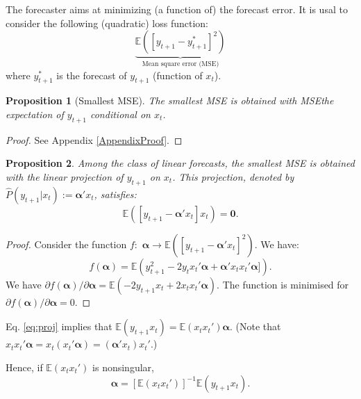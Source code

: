 \documentclass[
  12pt,
]{book}
\newtheorem{proposition}{Proposition}[chapter]
\theoremstyle{definition}
\theoremstyle{definition}
\theoremstyle{definition}
\theoremstyle{definition}
\theoremstyle{remark}
\begin{document}
The forecaster aims at minimizing (a function of) the forecast error. It is usal to consider the following (quadratic) loss function:
\[
\underbrace{\mathbb{E}([y_{t+1} - y^*_{t+1}]^2)}_{\mbox{Mean square error (MSE)}}
\]
where \(y^*_{t+1}\) is the forecast of \(y_{t+1}\) (function of \(x_t\)).

\begin{proposition}[Smallest MSE]
\protect\hypertarget{prp:smallestMSE}{}\label{prp:smallestMSE}The smallest MSE is obtained with MSEthe expectation of \(y_{t+1}\) conditional on \(x_t\).
\end{proposition}

\begin{proof}
See Appendix \ref{AppendixProof}.
\end{proof}

\begin{proposition}
\protect\hypertarget{prp:smallestMSElinear}{}\label{prp:smallestMSElinear}Among the class of linear forecasts, the smallest MSE is obtained with the linear projection of \(y_{t+1}\) on \(x_t\).
This projection, denoted by \(\hat{P}(y_{t+1}|x_t):=\boldsymbol\alpha'x_t\), satisfies:
\begin{equation}
\mathbb{E}\left( [y_{t+1} - \boldsymbol\alpha'x_t]x_t \right)=\mathbf{0}.\label{eq:proj}
\end{equation}
\end{proposition}

\begin{proof}
Consider the function \(f:\) \(\boldsymbol\alpha \rightarrow \mathbb{E}\left( [y_{t+1} - \boldsymbol\alpha'x_t]^2 \right)\). We have:
\[
f(\boldsymbol\alpha) = \mathbb{E}\left( y_{t+1}^2 - 2 y_t x_t'\boldsymbol\alpha + \boldsymbol\alpha'x_t x_t'\boldsymbol\alpha] \right).
\]
We have \(\partial f(\boldsymbol\alpha)/\partial \boldsymbol\alpha = \mathbb{E}(-2 y_{t+1} x_t + 2 x_t x_t'\boldsymbol\alpha)\). The function is minimised for \(\partial f(\boldsymbol\alpha)/\partial \boldsymbol\alpha =0\).
\end{proof}

Eq. \eqref{eq:proj} implies that \(\mathbb{E}\left( y_{t+1}x_t \right)=\mathbb{E}\left(x_tx_t' \right)\boldsymbol\alpha\). (Note that \(x_t x_t'\boldsymbol\alpha=x_t (x_t'\boldsymbol\alpha)=(\boldsymbol\alpha'x_t) x_t'\).)

Hence, if \(\mathbb{E}\left(x_tx_t' \right)\) is nonsingular,
\begin{equation}
\boldsymbol\alpha=[\mathbb{E}\left(x_tx_t' \right)]^{-1}\mathbb{E}\left( y_{t+1}x_t \right).\label{eq:linproj}
\end{equation}
\end{document}

